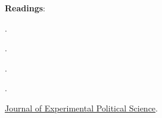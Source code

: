 \documentclass[letterpaper]{article}
\renewenvironment{itemize}{
  \begin{list}{}{
    \setlength{\leftmargin}{1.5em}
  }
}{
  \end{list}
}
\begin{document}
\begin{itemize}

  \item {\bf Readings}: 

    \begin{itemize} 



    \item[$\diamond$] \href{http://www.nber.org/papers/w14690}{}.

    \item[$\diamond$] \href{http:www.aeaweb.org/articles.php?doi=10.1257/jel.48.2.399}{}.


    \item[$\diamond$] \href{https://doi-org.ezproxy.utu.fi/10.1017/CBO9780511762888}{}.

    \item[$\diamond$] \href{https://doi.org/10.1093/pan/mpl013}{}.




    \item[$\diamond$] \href{https://www.cambridge.org/core/journals/journal-of-experimental-political-science}{Journal of Experimental Political Science}.


\end{itemize}
\end{itemize}
\end{document}
